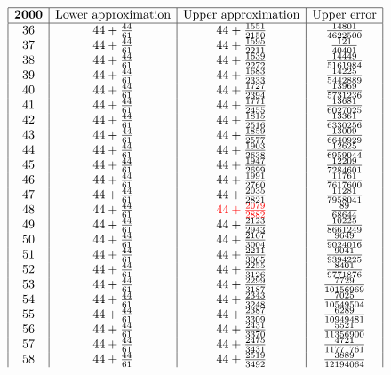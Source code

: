 \documentclass{amsart}
\begin{document}
$$\begin{array}{|c|c|c|c|} 
\hline
 {\bf 2000}&\text{Lower approximation}&\text{Upper approximation}&\text{Upper error}\\
 \hline
36&44+\frac{44}{61}&44+\frac{1551}{2150}&\frac{14801}{4622500}\\
37&44+\frac{44}{61}&44+\frac{1595}{2211}&\frac{121}{40401}\\
38&44+\frac{44}{61}&44+\frac{1639}{2272}&\frac{14449}{5161984}\\
39&44+\frac{44}{61}&44+\frac{1683}{2333}&\frac{14225}{5442889}\\
40&44+\frac{44}{61}&44+\frac{1727}{2394}&\frac{13969}{5731236}\\
41&44+\frac{44}{61}&44+\frac{1771}{2455}&\frac{13681}{6027025}\\
42&44+\frac{44}{61}&44+\frac{1815}{2516}&\frac{13361}{6330256}\\
43&44+\frac{44}{61}&44+\frac{1859}{2577}&\frac{13009}{6640929}\\
44&44+\frac{44}{61}&44+\frac{1903}{2638}&\frac{12625}{6959044}\\
45&44+\frac{44}{61}&44+\frac{1947}{2699}&\frac{12209}{7284601}\\
46&44+\frac{44}{61}&44+\frac{1991}{2760}&\frac{11761}{7617600}\\
47&44+\frac{44}{61}&44+\frac{2035}{2821}&\frac{11281}{7958041}\\
48&44+\frac{44}{61}&{\color{red}44+\frac{2079}{2882}}&\frac{89}{68644}\\
49&44+\frac{44}{61}&44+\frac{2123}{2943}&\frac{10225}{8661249}\\
50&44+\frac{44}{61}&44+\frac{2167}{3004}&\frac{9649}{9024016}\\
51&44+\frac{44}{61}&44+\frac{2211}{3065}&\frac{9041}{9394225}\\
52&44+\frac{44}{61}&44+\frac{2255}{3126}&\frac{8401}{9771876}\\
53&44+\frac{44}{61}&44+\frac{2299}{3187}&\frac{7729}{10156969}\\
54&44+\frac{44}{61}&44+\frac{2343}{3248}&\frac{7025}{10549504}\\
55&44+\frac{44}{61}&44+\frac{2387}{3309}&\frac{6289}{10949481}\\
56&44+\frac{44}{61}&44+\frac{2431}{3370}&\frac{5521}{11356900}\\
57&44+\frac{44}{61}&44+\frac{2475}{3431}&\frac{4721}{11771761}\\
58&44+\frac{44}{61}&44+\frac{2519}{3492}&\frac{3889}{12194064}\\

\end{array}$$
\end{document}

